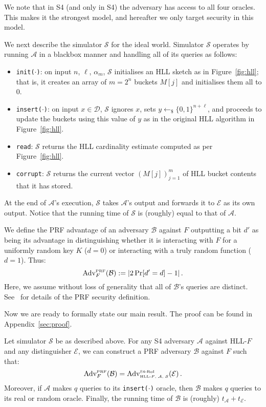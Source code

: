 \documentclass[sigconf, anonymous, dvipsnames]{acmart} %
\begin{document}
We note that in S4 (and only in S4) the adversary has access to all four oracles. This makes it the strongest model, and hereafter we only target security in this model. 

We next describe the simulator ${\mathcal{S}}$ for the ideal world. Simulator ${\mathcal{S}}$ operates by running ${\mathcal{A}}$ in a blackbox manner and handling all of its queries as follows: 
\begin{itemize}
\item \texttt{init($\cdot$)}: on input $n$, $\ell$, $\alpha_m$, ${\mathcal{S}}$ initialises an HLL sketch as in Figure~\ref{fig:hll}; that is, it creates an array of $m=2^n$ buckets $M[j]$ and initialises them all to 0.
\item \texttt{insert($\cdot$)}: on input $x \in {{\mathcal{D}}}$,  ${\mathcal{S}}$ ignores $x$, sets $y \leftarrow_{\$} \{0,1\}^{n+\ell}$, and proceeds to update the buckets using this value of $y$ as in the original HLL algorithm in Figure~\ref{fig:hll}.
\item \texttt{read}:  ${\mathcal{S}}$ returns the HLL cardinality estimate computed as per Figure~\ref{fig:hll}.
\item \texttt{corrupt}: ${\mathcal{S}}$ returns the current vector $(M[j])_{j=1}^{m}$ of HLL bucket contents that it has stored.
\end{itemize}
At the end of ${\mathcal{A}}$'s execution, ${\mathcal{S}}$ takes ${\mathcal{A}}$'s output and forwards it to ${\mathcal{E}}$ as its own output. Notice that the running time of  ${\mathcal{S}}$ is (roughly) equal to that of ${\mathcal{A}}$.

We define the PRF advantage of an adversary ${{\mathcal{B}}}$ against $F$ outputting a bit $d'$ as being its advantage in distinguishing whether it is interacting with $F$ for a uniformly random key $K$ ($d=0$) or interacting with a truly random function ($d=1$). Thus: 
\[
\mbox{Adv}^{\mbox{\tiny PRF}}_{F}({{\mathcal{B}}}) := \lvert 2\Pr[d' = d] - 1 \rvert\,.
\]
Here, we assume without loss of generality that all of ${{\mathcal{B}}}$'s queries are distinct. See~\cite[Section 4.4.1]{BonehShoup} for details of the PRF security definition.

Now we are ready to formally state our main result. The proof can be found in Appendix~\ref{sec:proof}.
\begin{theorem}\label{thm:security-of-HLL-with-PRF}
Let simulator $\mathcal{S}$ be as described above. For any S4 adversary ${\mathcal{A}}$ against HLL-$F$ and any distinguisher $\mathcal{E}$, we can construct a PRF adversary ${{\mathcal{B}}}$ against $F$ such that:
\[
 \mbox{Adv}^{\mbox{\tiny PRF}}_{F}({{\mathcal{B}}}) = 
 \mbox{Adv}^{\mbox{\tiny S$4$-RoI}}_{\mbox{\tiny{HLL-$F$, ${\mathcal{A}}$, ${\mathcal{S}}$}}}({\mathcal{E}}) \,.
\]
Moreover, if ${\mathcal{A}}$ makes $q$ queries to its \texttt{insert($\cdot$)} oracle, then ${{\mathcal{B}}}$ makes $q$ queries to its real or random oracle. Finally, the running time of ${{\mathcal{B}}}$ is (roughly) $t_{\mathcal{A}}+t_{\mathcal{E}}$.
\end{theorem}
\end{document}
